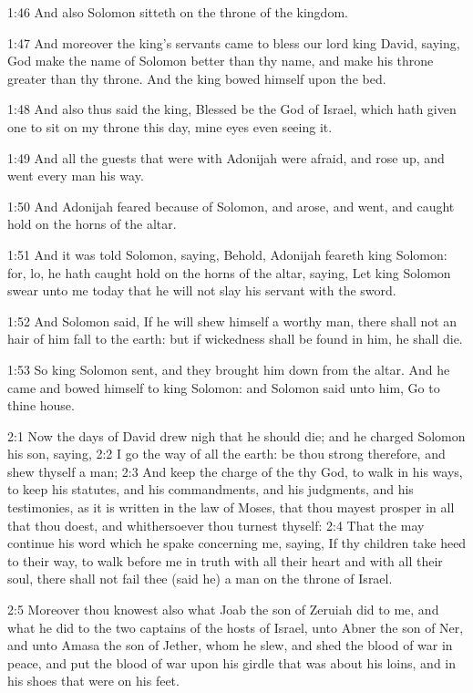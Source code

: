1:46 And also Solomon sitteth on the throne of the kingdom.

1:47 And moreover the king's servants came to bless our lord king David, saying, God make the name of Solomon better than thy name, and make his throne greater than thy throne. And the king bowed himself upon the bed.

1:48 And also thus said the king, Blessed be the \LORD God of Israel, which hath given one to sit on my throne this day, mine eyes even seeing it.

1:49 And all the guests that were with Adonijah were afraid, and rose up, and went every man his way.

1:50 And Adonijah feared because of Solomon, and arose, and went, and caught hold on the horns of the altar.

1:51 And it was told Solomon, saying, Behold, Adonijah feareth king Solomon: for, lo, he hath caught hold on the horns of the altar, saying, Let king Solomon swear unto me today that he will not slay his servant with the sword.

1:52 And Solomon said, If he will shew himself a worthy man, there shall not an hair of him fall to the earth: but if wickedness shall be found in him, he shall die.

1:53 So king Solomon sent, and they brought him down from the altar.  And he came and bowed himself to king Solomon: and Solomon said unto him, Go to thine house.

2:1 Now the days of David drew nigh that he should die; and he charged Solomon his son, saying, 2:2 I go the way of all the earth: be thou strong therefore, and shew thyself a man; 2:3 And keep the charge of the \LORD thy God, to walk in his ways, to keep his statutes, and his commandments, and his judgments, and his testimonies, as it is written in the law of Moses, that thou mayest prosper in all that thou doest, and whithersoever thou turnest thyself: 2:4 That the \LORD may continue his word which he spake concerning me, saying, If thy children take heed to their way, to walk before me in truth with all their heart and with all their soul, there shall not fail thee (said he) a man on the throne of Israel.

2:5 Moreover thou knowest also what Joab the son of Zeruiah did to me, and what he did to the two captains of the hosts of Israel, unto Abner the son of Ner, and unto Amasa the son of Jether, whom he slew, and shed the blood of war in peace, and put the blood of war upon his girdle that was about his loins, and in his shoes that were on his feet.

